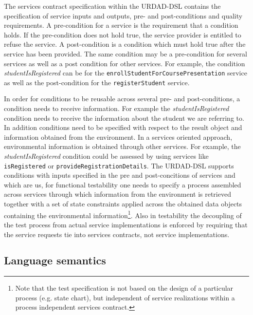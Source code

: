 The services contract specification within the URDAD-DSL contains the specification of service inputs and outputs, pre- and post-conditions and quality requirements. A pre-condition for a service is the requirement that a condition holds. If the pre-condition does not hold true, the service provider is entitled to refuse the service. A post-condition is a condition which must hold true after the service has been provided. The same condition may be a pre-condition for several services as well as a post condition for other services. For example, the condition \emph{studentIsRegistered} can be for the \verb+enrollStudentForCoursePresentation+ service as well as the post-condition for the \verb+registerStudent+ service. 

In order for conditions to be reusable across several pre- and post-conditions, a condition needs to receive information. For example the \emph{studentIsRegistered} condition needs to receive the information about the student we are referring to. In addition conditions need to be specified with respect to the result object and information obtained from the environment. In a services oriented approach, environmental information is obtained through other services. For example, the \emph{studentIsRegistered} condition could be assessed by using services like \verb+isRegistered+ or \verb+provideRegistrationDetails+. The URDAD-DSL supports conditions with inputs specified in the pre and post-concitions of services and which are us, for functional testability one needs to specify a process assembled across services through which information from the environment is retrieved together with a set of state constraints applied across the obtained data objects containing the environmental information\footnote{Note that the test specification is not based on the design of a particular process (e.g. state chart), but independent of service realizations within a process independent services contract.}. Also in testability the decoupling of the test process from actual service implementations is enforced by requiring that the service requests tie into services contracts, not service implementations. 


 


\subsection{Language semantics}



